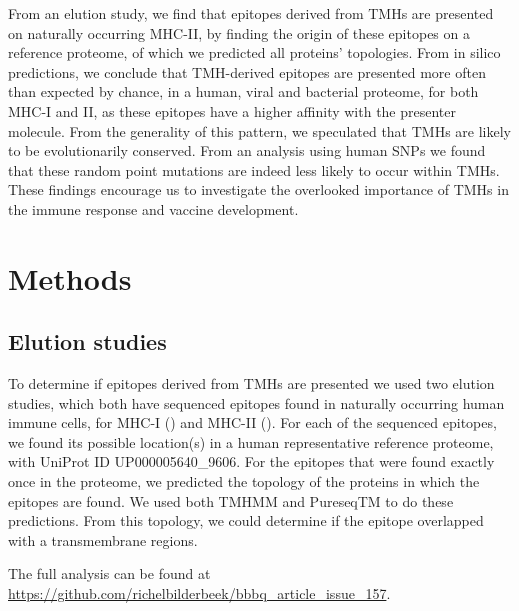 From an elution study, we find that epitopes derived 
from TMHs are presented on naturally occurring MHC-II,
by finding the origin of these epitopes on a reference proteome,
of which we predicted all proteins' topologies.
From in silico predictions, we conclude that TMH-derived
epitopes are presented more often than expected by chance,
in a human, viral and bacterial proteome, for both MHC-I and II,
as these epitopes have a higher affinity with the presenter molecule.
From the generality of this pattern, we speculated that TMHs
are likely to be evolutionarily conserved. From an analysis using human
SNPs we found that these random point mutations are indeed less likely
to occur within TMHs. These findings encourage us to investigate the
overlooked importance of TMHs in the immune response and vaccine development.

\section{Methods}

\subsection{Elution studies}\label{subsec:elution_studies}

To determine if epitopes derived from TMHs are presented 
we used two elution studies, which both have sequenced
epitopes found in naturally occurring human immune cells,
for MHC-I (\cite{schellens2015comprehensive}) 
and MHC-II (\cite{bergseng2015different}).
For each of the sequenced epitopes,
we found its possible location(s) in 
a human representative reference proteome,
with UniProt ID UP000005640_9606.
For the epitopes that were found exactly once in the proteome,
we predicted the topology of the proteins in which the epitopes are found.
We used both TMHMM and PureseqTM to do these predictions. 
From this topology, we could determine if the epitope
overlapped with a transmembrane regions.

The full analysis can be found
at \url{https://github.com/richelbilderbeek/bbbq_article_issue_157}.

